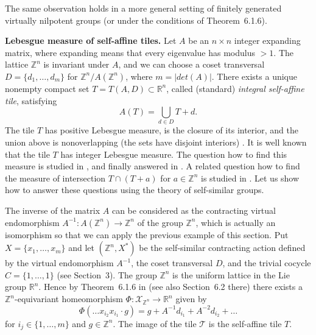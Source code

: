 \documentclass[12pt]{article}
\newcommand{\xmo}{X^{-\omega}}
\newcommand{\Z}{\mathbb{Z}}
\newcommand{\limGs}[1][G]{\mathcal{X}_{#1}}
\newcommand{\tile}{\mathscr{T}}
\theoremstyle{definition}
\begin{document}
The same observation holds in a more general setting of finitely generated virtually nilpotent
groups (or under the conditions of Theorem~6.1.6).


\vspace{0.3cm}\noindent\textbf{Lebesgue measure of self-affine tiles.} Let $A$ be an $n\times n$
integer expanding matrix, where expanding means that every eigenvalue has modulus $>1$. The lattice
$\Z^n$ is invariant under $A$, and we can choose a coset transversal $D=\{d_1,\ldots,d_m\}$ for
$\Z^n/A(\Z^n)$, where $m=|det(A)|$.
There exists a unique nonempty compact set $T=T(A,D)\subset\mathbb{R}^n$, called (standard)
\textit{integral self-affine tile}, satisfying
\[
A(T)=\bigcup_{d\in D} T+d.
\]
The tile $T$ has positive Lebesgue measure, is the closure of its interior, and the union above is
nonoverlapping (the sets have disjoint interiors) \cite{lag_wang:self_affine}. It is well known
\cite{lag_wang:int_self_affine_I} that the tile $T$ has integer Lebesgue measure. The question how
to find this measure is studied in
\cite{lag_wang:int_self_affine_I,he_hui:self_affine,deng_he:int_self_affine}, and finally answered
in \cite{gab_yu:natur_til}. A related question how to find the measure of intersection $T\cap
(T+a)$ for $a\in\mathbb{Z}^n$ is studied in \cite{gab_yu:natur_til,int_two_tiles}. Let us show how
to answer these questions using the theory of self-similar groups.

The inverse of the matrix $A$ can be considered as the contracting virtual endomorphism $A^{-1}:
A(\Z^n)\rightarrow\Z^n$ of the group $\Z^n$, which is actually an isomorphism so that we can apply
the previous example of this section. Put $X=\{x_1,\ldots,x_m\}$ and let $(\mathbb{Z}^n,X^{*})$ be
the self-similar contracting action defined by the virtual endomorphism $A^{-1}$, the coset
transversal $D$, and the trivial cocycle $C=\{1,\ldots,1\}$ (see Section~3). The group $\Z^n$ is
the uniform lattice in the Lie group $\mathbb{R}^n$. Hence by Theorem~6.1.6 in
\cite{self_sim_groups} (see also Section~6.2 there) there exists a $\Z^n$-equivariant homeomorphism
$\Phi:\limGs[\Z^n]\rightarrow\mathbb{R}^n$ given by
\[
\Phi(\ldots x_{i_2} x_{i_1}\cdot g)=g+A^{-1}d_{i_1}+A^{-2}d_{i_2}+\ldots
\]
for $i_j\in\{1,\ldots,m\}$ and $g\in\Z^n$. The image of the tile $\tile$ is the self-affine tile
$T$.


%
%
\end{document}
